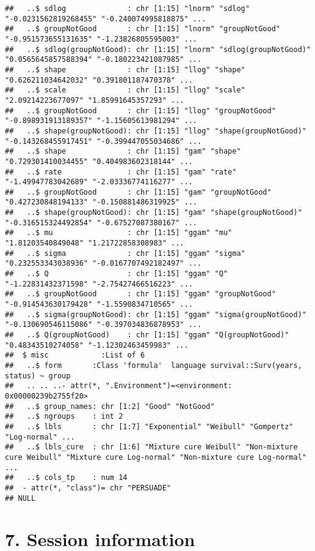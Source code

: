 \documentclass[
]{article}
\begin{document}
\begin{verbatim}
##   ..$ sdlog              : chr [1:15] "lnorm" "sdlog" "-0.0231562819268455" "-0.240074995818875" ...
##   ..$ groupNotGood       : chr [1:15] "lnorm" "groupNotGood" "-0.951573655131635" "-1.23826805595003" ...
##   ..$ sdlog(groupNotGood): chr [1:15] "lnorm" "sdlog(groupNotGood)" "0.0565645857588394" "-0.180223421087985" ...
##   ..$ shape              : chr [1:15] "llog" "shape" "0.626211034642032" "0.391801187470378" ...
##   ..$ scale              : chr [1:15] "llog" "scale" "2.09214223677097" "1.85991645357293" ...
##   ..$ groupNotGood       : chr [1:15] "llog" "groupNotGood" "-0.898931913189357" "-1.15605613981294" ...
##   ..$ shape(groupNotGood): chr [1:15] "llog" "shape(groupNotGood)" "-0.143268455917451" "-0.399447055034686" ...
##   ..$ shape              : chr [1:15] "gam" "shape" "0.729301410034455" "0.404983602318144" ...
##   ..$ rate               : chr [1:15] "gam" "rate" "-1.49947783042689" "-2.03336774116277" ...
##   ..$ groupNotGood       : chr [1:15] "gam" "groupNotGood" "0.427230848194133" "-0.150881486319925" ...
##   ..$ shape(groupNotGood): chr [1:15] "gam" "shape(groupNotGood)" "-0.316515324492854" "-0.67527087380167" ...
##   ..$ mu                 : chr [1:15] "ggam" "mu" "1.81203540849048" "1.21722858308983" ...
##   ..$ sigma              : chr [1:15] "ggam" "sigma" "0.232553343038936" "-0.0167707492182497" ...
##   ..$ Q                  : chr [1:15] "ggam" "Q" "-1.22831432371598" "-2.75427466516223" ...
##   ..$ groupNotGood       : chr [1:15] "ggam" "groupNotGood" "-0.914543630179428" "-1.5590834710565" ...
##   ..$ sigma(groupNotGood): chr [1:15] "ggam" "sigma(groupNotGood)" "-0.130690546115086" "-0.397034836878953" ...
##   ..$ Q(groupNotGood)    : chr [1:15] "ggam" "Q(groupNotGood)" "0.48343510274058" "-1.12302463459983" ...
##  $ misc            :List of 6
##   ..$ form       :Class 'formula'  language survival::Surv(years, status) ~ group
##   .. .. ..- attr(*, ".Environment")=<environment: 0x00000239b2755f20> 
##   ..$ group_names: chr [1:2] "Good" "NotGood"
##   ..$ ngroups    : int 2
##   ..$ lbls       : chr [1:7] "Exponential" "Weibull" "Gompertz" "Log-normal" ...
##   ..$ lbls_cure  : chr [1:6] "Mixture cure Weibull" "Non-mixture cure Weibull" "Mixture cure Log-normal" "Non-mixture cure Log-normal" ...
##   ..$ cols_tp    : num 14
##  - attr(*, "class")= chr "PERSUADE"
## NULL
\end{verbatim}

\clearpage

\section{7. Session information}\label{session-information}
\end{document}
